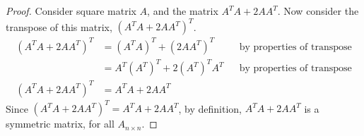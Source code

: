 \documentclass{article}
\begin{document}
\begin{proof}
    Consider square matrix $A$, and the matrix $A^TA + 2AA^T$. Now consider the transpose of this matrix, $(A^TA + 2AA^T)^T$.
    \begin{align*}
        (A^TA + 2AA^T)^T & = (A^TA)^T + (2AA^T)^T     &  & \text{by properties of transpose} \\
                         & = A^T(A^T)^T + 2(A^T)^TA^T &  & \text{by properties of transpose} \\
        (A^TA + 2AA^T)^T & = A^TA + 2AA^T
    \end{align*}
    Since $(A^TA + 2AA^T)^T = A^TA + 2AA^T$, by definition, $A^TA + 2AA^T$ is a symmetric matrix, for all $A_{n \times n}$.
\end{proof}
\qdash
\end{document}
